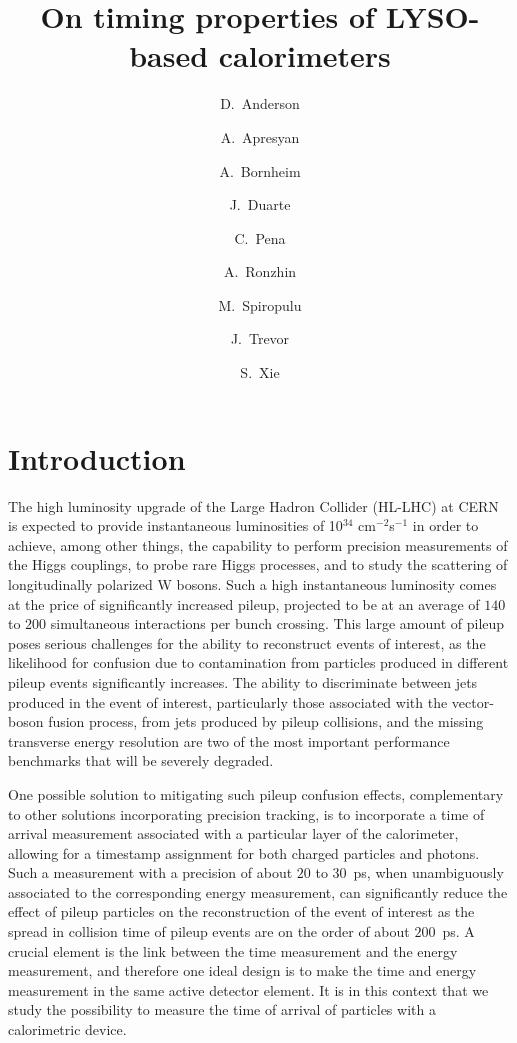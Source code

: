 \documentclass[12pt]{article}
\title{On timing properties of LYSO-based calorimeters}
\author[1]{D.~Anderson}
\author[1]{A.~Apresyan}
\author[1]{A.~Bornheim}
\author[1]{J.~Duarte}
\author[1]{C.~Pena}
\author[2]{A.~Ronzhin}
\author[1]{M.~Spiropulu}
\author[1]{J.~Trevor}
\author[1]{S.~Xie}
\affil[1]{California Institute of Technology, Pasadena, CA, USA}
\affil[2]{Fermi National Accelerator Laboratory, Batavia, IL, USA}
\date{}
\begin{document}
\maketitle
{}



\section{Introduction}

The high luminosity upgrade of the Large Hadron Collider (HL-LHC) at CERN~\cite{Rossi:1471000}
is expected to provide instantaneous luminosities of 10$^{34}$ cm$^{-2}$s$^{-1}$
in order to achieve, among other things, the capability to perform precision 
measurements of the Higgs couplings, to probe rare Higgs processes,
and to study the scattering of longitudinally polarized W bosons. Such a
high instantaneous luminosity comes at the price of significantly increased
pileup, projected to be at an average of $140$ to $200$ simultaneous 
interactions per bunch crossing. This large amount of pileup poses serious
challenges for the ability to reconstruct events of interest, as the 
likelihood for confusion due to contamination from particles produced
in different pileup events significantly increases. The ability to
discriminate between jets produced in the event of interest,
particularly those associated with the vector-boson fusion process,
from jets produced by pileup collisions, and the missing transverse energy
resolution are two of the most important performance benchmarks
that will be severely degraded.

One possible solution to mitigating such pileup confusion effects,
complementary to other solutions incorporating precision tracking,
is to incorporate a time of arrival measurement associated with a
particular layer of the calorimeter, allowing for a timestamp
assignment for both charged particles and photons. Such a measurement
with a precision of about $20$ to $30$~ps, when unambiguously
associated to the corresponding energy measurement, can significantly reduce
the effect of pileup particles on the reconstruction of the
event of interest as the spread in collision time of pileup events
are on the order of about $200$~ps. A crucial element is
the link between the time measurement and the energy measurement,
and therefore one ideal design is to make the time and energy
measurement in the same active detector element. It is in this context 
that we study the possibility to measure the time of arrival of 
particles with a calorimetric device.
\end{document}
